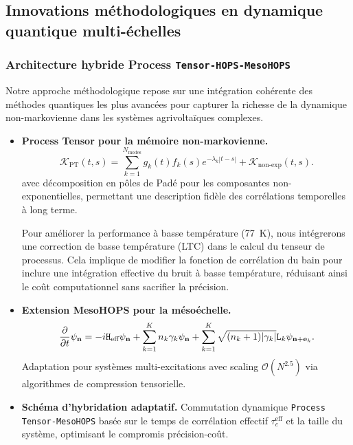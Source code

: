 \documentclass[12pt, a4paper]{article}
\begin{document}
\subsection{Innovations méthodologiques en dynamique quantique multi-échelles}

\subsubsection{Architecture hybride Process \texttt{Tensor-HOPS-MesoHOPS}}

Notre approche méthodologique repose sur une intégration cohérente des méthodes quantiques les plus avancées pour capturer la richesse de la dynamique non-markovienne dans les systèmes agrivoltaïques complexes.

\begin{itemize}
    \item \textbf{Process Tensor pour la mémoire non-markovienne.} 
    \begin{equation}
    \mathcal{K}_{\text{PT}}(t,s) = \sum_{k=1}^{N_{\text{modes}}} g_k(t) f_k(s) e^{-\lambda_k |t-s|} + \mathcal{K}_{\text{non-exp}}(t,s).
    \end{equation}
    avec décomposition en pôles de Padé pour les composantes non-exponentielles, permettant une description fidèle des corrélations temporelles à long terme.

    Pour améliorer la performance à basse température (\SI{77}{\kelvin}), nous intégrerons une correction de basse température (LTC) dans le calcul du tenseur de processus. Cela implique de modifier la fonction de corrélation du bain pour inclure une intégration effective du bruit à basse température, réduisant ainsi le coût computationnel sans
    sacrifier la précision.
    
    \item \textbf{Extension MesoHOPS pour la mésoéchelle.}
    \begin{equation}
    \pdv{t} \psi_{\mathbf{n}} = -i\mathtt{H}_{\text{eff}}\psi_{\mathbf{n}} + \sum_{k=1}^K n_k\gamma_k\psi_{\mathbf{n}} + \sum_{k=1}^K \sqrt{(n_k+1)|\gamma_k|} \mathtt{L}_k\psi_{\mathbf{n}+\mathbf{e}_k}.
    \end{equation}
    Adaptation pour systèmes multi-excitations avec scaling $\mathcal{O}(N^{2.5})$ via algorithmes de compression tensorielle.
    
    \item \textbf{Schéma d'hybridation adaptatif.} Commutation dynamique \texttt{Process Tensor-MesoHOPS} basée sur le temps de corrélation effectif $\tau_c^{\text{eff}}$ et la taille du système, optimisant le compromis précision-coût.
\end{itemize}
\end{document}
